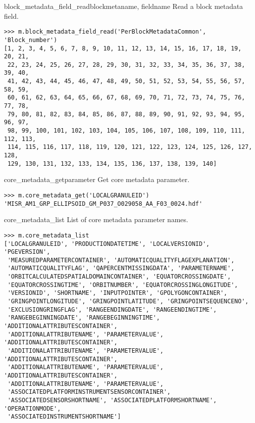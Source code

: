 \documentclass{howto}
\begin{document}
\begin{methoddesc}{block_metadata_field_read}{blockmetaname, fieldname}
  Read a block metadata field.

\begin{verbatim}
>>> m.block_metadata_field_read('PerBlockMetadataCommon', 'Block_number')
[1, 2, 3, 4, 5, 6, 7, 8, 9, 10, 11, 12, 13, 14, 15, 16, 17, 18, 19, 20, 21,
 22, 23, 24, 25, 26, 27, 28, 29, 30, 31, 32, 33, 34, 35, 36, 37, 38, 39, 40,
 41, 42, 43, 44, 45, 46, 47, 48, 49, 50, 51, 52, 53, 54, 55, 56, 57, 58, 59,
 60, 61, 62, 63, 64, 65, 66, 67, 68, 69, 70, 71, 72, 73, 74, 75, 76, 77, 78,
 79, 80, 81, 82, 83, 84, 85, 86, 87, 88, 89, 90, 91, 92, 93, 94, 95, 96, 97,
 98, 99, 100, 101, 102, 103, 104, 105, 106, 107, 108, 109, 110, 111, 112, 113,
 114, 115, 116, 117, 118, 119, 120, 121, 122, 123, 124, 125, 126, 127, 128,
 129, 130, 131, 132, 133, 134, 135, 136, 137, 138, 139, 140]
\end{verbatim}
\end{methoddesc}

\begin{methoddesc}{core_metadata_get}{parameter}
  Get core metadata parameter.

\begin{verbatim}
>>> m.core_metadata_get('LOCALGRANULEID')
'MISR_AM1_GRP_ELLIPSOID_GM_P037_O029058_AA_F03_0024.hdf'
\end{verbatim}
\end{methoddesc}

\begin{memberdesc}[list]{core_metadata_list}
  List of core metadata parameter names.

\begin{verbatim}
>>> m.core_metadata_list
['LOCALGRANULEID', 'PRODUCTIONDATETIME', 'LOCALVERSIONID', 'PGEVERSION',
 'MEASUREDPARAMETERCONTAINER', 'AUTOMATICQUALITYFLAGEXPLANATION',
 'AUTOMATICQUALITYFLAG', 'QAPERCENTMISSINGDATA', 'PARAMETERNAME',
 'ORBITCALCULATEDSPATIALDOMAINCONTAINER', 'EQUATORCROSSINGDATE',
 'EQUATORCROSSINGTIME', 'ORBITNUMBER', 'EQUATORCROSSINGLONGITUDE',
 'VERSIONID', 'SHORTNAME', 'INPUTPOINTER', 'GPOLYGONCONTAINER',
 'GRINGPOINTLONGITUDE', 'GRINGPOINTLATITUDE', 'GRINGPOINTSEQUENCENO',
 'EXCLUSIONGRINGFLAG', 'RANGEENDINGDATE', 'RANGEENDINGTIME',
 'RANGEBEGINNINGDATE', 'RANGEBEGINNINGTIME', 'ADDITIONALATTRIBUTESCONTAINER',
 'ADDITIONALATTRIBUTENAME', 'PARAMETERVALUE', 'ADDITIONALATTRIBUTESCONTAINER',
 'ADDITIONALATTRIBUTENAME', 'PARAMETERVALUE', 'ADDITIONALATTRIBUTESCONTAINER',
 'ADDITIONALATTRIBUTENAME', 'PARAMETERVALUE', 'ADDITIONALATTRIBUTESCONTAINER',
 'ADDITIONALATTRIBUTENAME', 'PARAMETERVALUE',
 'ASSOCIATEDPLATFORMINSTRUMENTSENSORCONTAINER',
 'ASSOCIATEDSENSORSHORTNAME', 'ASSOCIATEDPLATFORMSHORTNAME', 'OPERATIONMODE',
 'ASSOCIATEDINSTRUMENTSHORTNAME']
\end{verbatim}
\end{memberdesc}
\end{document}
